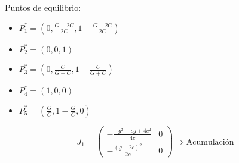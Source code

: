 \documentclass[twocolumn,aps,prl]{revtex4-1}
\begin{document}
Puntos de equilibrio:

\begin{itemize}
    \item[] $P_1^* = (0, \frac{G-2C}{2C}, 1 - \frac{G-2C}{2C})$
    \item[] $P_2^* = (0, 0, 1)$
    \item[] $P_3^* = (0, \frac{C}{G+C}, 1 - \frac{C}{G+C})$
    \item[] $P_4^* = (1, 0, 0)$
    \item[] $P_5^* = (\frac{G}{C}, 1- \frac{G}{C}, 0)$
\end{itemize}






$$J_1 =
\begin{pmatrix}
    -\frac{-g^2+cg+4c^2}{4c}
    &
    0
    \\  
    -\frac{\left(g-2c\right)^2}{2c}
    &
    0
\end{pmatrix}
\Rightarrow \text{Acumulación}
$$
\end{document}
